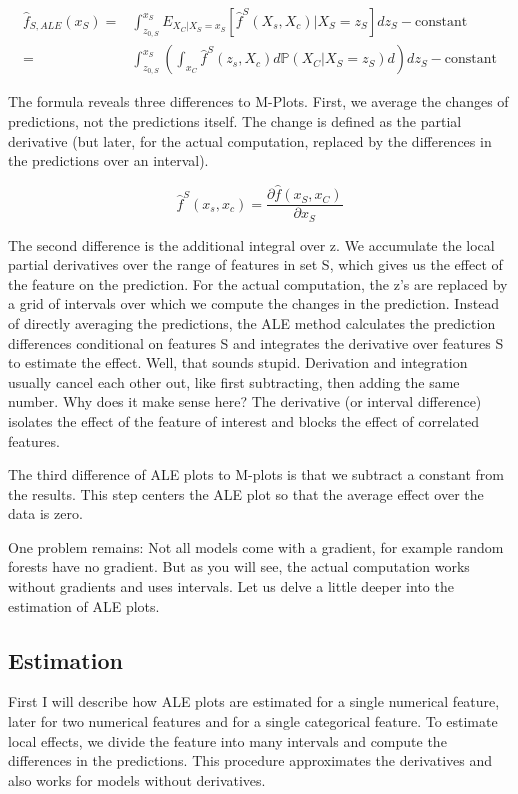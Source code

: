 \documentclass[
  11pt,
]{scrbook}
\begin{document}
\begin{align*}
\hat{f}_{S,ALE}(x_S)=&\int_{z_{0,S}}^{x_S}E_{X_C|X_S = x_S}\left[\hat{f}^S(X_s,X_c)|X_S=z_S\right]dz_S-\text{constant}\\
 = & \int_{z_{0,S}}^{x_S}(\int_{x_C}\hat{f}^S(z_s,X_c)d\mathbb{P}(X_C|X_S = z_S)d{})dz_S-\text{constant}
\end{align*}

The formula reveals three differences to M-Plots.
First, we average the changes of predictions, not the predictions itself.
The change is defined as the partial derivative (but later, for the actual computation, replaced by the differences in the predictions over an interval).

\[\hat{f}^S(x_s,x_c)=\frac{\partial\hat{f}(x_S,x_C)}{\partial{}x_S}\]

The second difference is the additional integral over z.
We accumulate the local partial derivatives over the range of features in set S, which gives us the effect of the feature on the prediction.
For the actual computation, the z's are replaced by a grid of intervals over which we compute the changes in the prediction.
Instead of directly averaging the predictions, the ALE method calculates the prediction differences conditional on features S and integrates the derivative over features S to estimate the effect.
Well, that sounds stupid.
Derivation and integration usually cancel each other out, like first subtracting, then adding the same number.
Why does it make sense here?
The derivative (or interval difference) isolates the effect of the feature of interest and blocks the effect of correlated features.

The third difference of ALE plots to M-plots is that we subtract a constant from the results.
This step centers the ALE plot so that the average effect over the data is zero.

One problem remains:
Not all models come with a gradient, for example random forests have no gradient.
But as you will see, the actual computation works without gradients and uses intervals.
Let us delve a little deeper into the estimation of ALE plots.

\hypertarget{estimation}{%
\subsection{Estimation}\label{estimation}}

First I will describe how ALE plots are estimated for a single numerical feature, later for two numerical features and for a single categorical feature.
To estimate local effects, we divide the feature into many intervals and compute the differences in the predictions.
This procedure approximates the derivatives and also works for models without derivatives.
\end{document}
